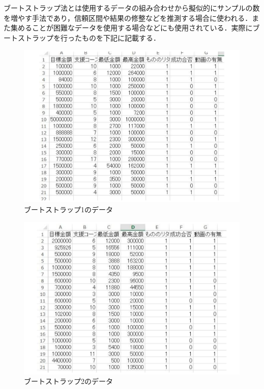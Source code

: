 ブートストラップ法とは使用するデータの組み合わせから擬似的にサンプルの数を増やす手法であり，信頼区間や結果の修整などを推測する場合に使われる．また集めることが困難なデータを使用する場合などにも使用されている．実際にブートストラップを行ったものを下記に記載する．
\begin{figure}[H]
\centering
\includegraphics[width=13cm]{figure41.pdf}
\caption{ブートストラップ1のデータ}\label{sannp}
\end{figure}

\begin{figure}[H]
\centering
\includegraphics[width=13cm]{figure42.pdf}
\caption{ブートストラップ2のデータ}\label{sannp}
\end{figure}

